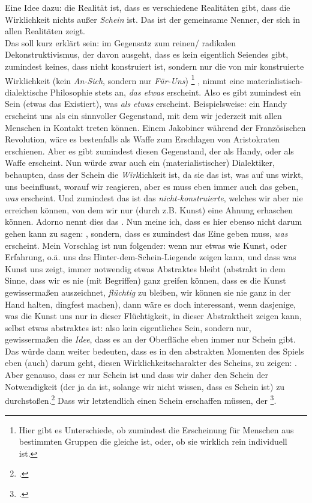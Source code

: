 \documentclass[12pt, a4paper, openany]{report}
\begin{document}
Eine Idee dazu: die Realität ist, dass es verschiedene Realitäten gibt, dass die Wirklichkeit nichts außer \emph{Schein} ist.
Das ist der gemeinsame Nenner, der sich in allen Realitäten zeigt.\\
Das soll kurz erklärt sein: 
im Gegensatz zum reinen/ radikalen Dekonstruktivismus, der davon ausgeht, dass es kein eigentlich Seiendes gibt, zumindest keines, dass nicht konstruiert ist, sondern nur die von mir konstruierte Wirklichkeit (kein \emph{An-Sich}, sondern nur \emph{Für-Uns})%
\footnote{Hier gibt es Unterschiede, ob zumindest die Erscheinung für Menschen aus bestimmten Gruppen die gleiche ist, oder, ob sie wirklich rein individuell ist.}%
, nimmt eine materialistisch-dialektische Philosophie stets an, \emph{das etwas} erscheint.
Also es gibt zumindest ein Sein (etwas das Existiert), was \emph{als etwas} erscheint.
Beispielsweise: 
ein Handy erscheint uns als ein sinnvoller Gegenstand, mit dem wir jederzeit mit allen Menschen in Kontakt treten können.
Einem Jakobiner während der Französischen Revolution, wäre es bestenfalls als Waffe zum Erschlagen von Aristokraten erschienen.
Aber es gibt zumindest diesen Gegenstand, der als Handy, oder als Waffe erscheint.
Nun würde zwar auch ein (materialistischer) Dialektiker, behaupten, dass der Schein die \emph{Wirk}lichkeit ist, da sie das ist, was auf uns wirkt, uns beeinflusst, worauf wir reagieren, aber es muss eben immer auch das geben, \emph{was} erscheint. 
Und zumindest das ist das \emph{nicht-konstruierte}, welches wir aber nie erreichen können, von dem wir nur (durch z.B. Kunst) eine Ahnung erhaschen können.
Adorno nennt dies das .
Nun meine ich, dass es hier ebenso nicht darum gehen kann zu sagen: 
, sondern, dass es zumindest das Eine geben muss, \emph{was} erscheint. 
Mein Vorschlag ist nun folgender: wenn nur etwas wie Kunst, oder Erfahrung, o.ä. uns das Hinter-dem-Schein-Liegende zeigen kann, und dass was Kunst uns zeigt, immer notwendig etwas Abstraktes bleibt (abstrakt in dem Sinne, dass wir es nie (mit Begriffen) ganz greifen können, dass es die Kunst gewissermaßen auszeichnet, \emph{flüchtig} zu bleiben, wir können sie nie ganz in der Hand halten, dingfest machen), dann wäre es doch interessant, wenn dasjenige, was die Kunst uns nur in dieser Flüchtigkeit, in dieser Abstraktheit zeigen kann, selbst etwas abstraktes ist: also kein eigentliches Sein, sondern nur, gewissermaßen die \emph{Idee}, dass es an der Oberfläche eben immer nur Schein gibt. 
Das würde dann weiter bedeuten, dass es in den abstrakten Momenten des Spiels eben (auch) darum geht, diesen Wirklichkeitscharakter des Scheins, zu zeigen: 
. 
Aber genauso, dass er nur Schein ist und dass wir daher den Schein der Notwendigkeit (der ja da ist, solange wir nicht wissen, dass es Schein ist) zu durchstoßen.\footcite[Vgl.][41]{menke_autonomie_2018}
Dass wir letztendlich einen Schein erschaffen müssen, der \footcite[][417]{nietzsche_morgenrote_1999}.
\end{document}
